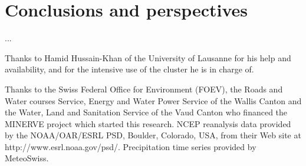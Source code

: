 \documentclass{ametsoc}
\begin{document}
\section{Conclusions and perspectives}
...



%
\acknowledgments
Thanks to Hamid Hussain-Khan of the University of Lausanne for his help and availability, and for the intensive use of the cluster he is in charge of.

Thanks to the Swiss Federal Office for Environment (FOEV), the Roads and Water courses Service, Energy and Water Power Service of the Wallis Canton and the Water, Land and Sanitation Service of the Vaud Canton who financed the MINERVE project which started this research. NCEP reanalysis data provided by the NOAA/OAR/ESRL PSD, Boulder, Colorado, USA, from their Web site at http://www.esrl.noaa.gov/psd/. Precipitation time series provided by MeteoSwiss. 


%





\end{document}
